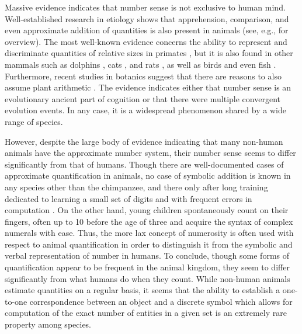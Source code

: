 Massive evidence indicates that number sense is not exclusive to human mind. Well-established research in etiology shows that apprehension, comparison, and even approximate addition of quantities is also present in animals (see, e.g., \citealt[pp. 13--40]{davis_perusse1988numerical,gallistel1989animal,dehaene1997number} for overview). The most well-known evidence concerns the ability to represent and discriminate quantities of relative sizes in primates \citep[e.g.,][]{woodruff_premack1981primative,matsuzawa1985use,rumbaugh_et-al1987summation,washburn_rumbaugh1991ordinal,boysen_et-al1996quantity}, but it is also found in other mammals such as dolphins \citep{mitchell_et-al1985discriminative}, cats \citep{thompson_et-al1970number}, and rats \citep{capaldi_miller1988counting}, as well as birds \citep{pepperberg1987evidence} and even fish \citep{agrillo_et-al2012evidence}. Furthermore, recent studies in botanics suggest that there are reasons to also assume plant arithmetic \citep{bohm_et-al2016venus}. The evidence indicates either that number sense is an evolutionary ancient part of cognition or that there were multiple convergent evolution events. In any case, it is a widespread phenomenon shared by a wide range of species.

However, despite the large body of evidence indicating that many non-human animals have the approximate number system, their number sense seems to differ significantly from that of humans. Though there are well-documented cases of approximate quantification in animals, no case of symbolic addition is known in any species other than the chimpanzee, and there only after long training dedicated to learning a small set of digits and with frequent errors in computation \citep[p. 39]{dehaene1997number}. On the other hand, young children spontaneously count on their fingers, often up to 10 before the age of three and acquire the syntax of complex numerals with ease. Thus, the more lax concept of numerosity is often used with respect to animal quantification in order to distinguish it from the symbolic and verbal representation of number in humans. To conclude, though some forms of quantification appear to be frequent in the animal kingdom, they seem to differ significantly from what humans do when they count. While non-human animals estimate quantities on a regular basis, it seems that the ability to establish a one-to-one correspondence between an object and a discrete symbol which allows for computation of the exact number of entities in a given set is an extremely rare property among species. 

